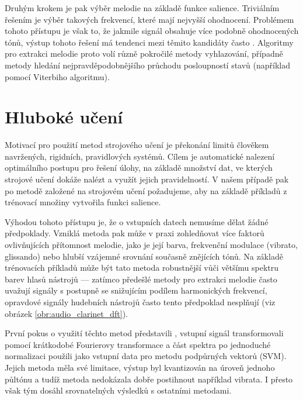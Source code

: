 Druhým krokem je pak výběr melodie na základě funkce salience. Triviálním řešením je výběr takových frekvencí, které mají nejvyšší ohodnocení. Problémem tohoto přístupu je však to, že jakmile signál obsahuje více podobně ohodnocených tónů, výstup tohoto řešení má tendenci mezi těmito kandidáty často . Algoritmy pro extrakci melodie proto volí různě pokročilé metody vyhlazování, případně metody hledání nejpravděpodobnějšího průchodu posloupností stavů (například pomocí Viterbiho algoritmu).

\section{Hluboké učení}

Motivací pro použití metod strojového učení je překonání limitů člověkem navržených, rigidních, pravidlových systémů. Cílem je automatické nalezení optimálního postupu pro řešení úlohy, na základě množství dat, ve kterých strojové učení dokáže nalézt a využít jejich pravidelností. V našem případě pak po metodě založené na strojovém učení požadujeme, aby na základě příkladů z trénovací množiny vytvořila funkci salience.

Výhodou tohoto přístupu je, že o vstupních datech nemusíme dělat žádné předpoklady. Vzniklá metoda pak může v praxi zohledňovat více faktorů ovlivňujících přítomnost melodie, jako je její barva, frekvenční modulace (vibrato, glissando) nebo hlubší vzájemné srovnání současně znějících tónů. Na základě trénovacích příkladů může být tato metoda robustnější vůči většímu spektru barev hlasů nástrojů --- zatímco předešlé metody pro extrakci melodie často uvažují signály s postupně se snižujícím podílem harmonických frekvencí, opravdové signály hudebních nástrojů často tento předpoklad nesplňují (viz obrázek \ref{obr:audio_clarinet_dft}).

První pokus o využití těchto metod představili \cite{Poliner}, vstupní signál transformovali pomocí krátkodobé Fourierovy transformace a část spektra po jednoduché normalizaci použili jako vstupní data pro metodu podpůrných vektorů (SVM). Jejich metoda měla své limitace, výstup byl kvantizován na úroveň jednoho půltónu a tudíž metoda nedokázala dobře postihnout například vibrata. I přesto však tým dosáhl srovnatelných výsledků s ostatními metodami. 

